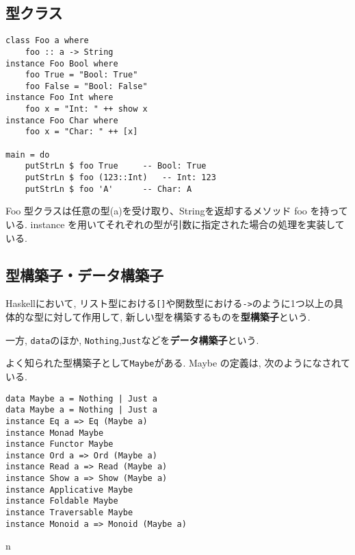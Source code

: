 \subsection{型クラス}
\begin{lstlisting}
class Foo a where
    foo :: a -> String
instance Foo Bool where
    foo True = "Bool: True"
    foo False = "Bool: False"
instance Foo Int where
    foo x = "Int: " ++ show x
instance Foo Char where
    foo x = "Char: " ++ [x]

main = do
    putStrLn $ foo True		-- Bool: True
    putStrLn $ foo (123::Int)	-- Int: 123
    putStrLn $ foo 'A'		-- Char: A
\end{lstlisting}
Foo 型クラスは任意の型(a)を受け取り、Stringを返却するメソッド foo を持っている. instance を用いてそれぞれの型が引数に指定された場合の処理を実装している.
\subsection{型構築子・データ構築子}
Haskellにおいて, リスト型における\verb|[]|や関数型における\verb|->|のように1つ以上の具体的な型に対して作用して, 新しい型を構築するものを{\bf 型構築子}という.

一方, \verb|data|のほか, \verb|Nothing|,\verb|Just|などを{\bf データ構築子}という.

よく知られた型構築子として\verb|Maybe|がある. Maybe の定義は, 次のようになされている.
\begin{lstlisting}
data Maybe a = Nothing | Just a
data Maybe a = Nothing | Just a         
instance Eq a => Eq (Maybe a) 
instance Monad Maybe 
instance Functor Maybe 
instance Ord a => Ord (Maybe a) 
instance Read a => Read (Maybe a) 
instance Show a => Show (Maybe a) 
instance Applicative Maybe 
instance Foldable Maybe 
instance Traversable Maybe 
instance Monoid a => Monoid (Maybe a) 
\end{lstlisting}






n